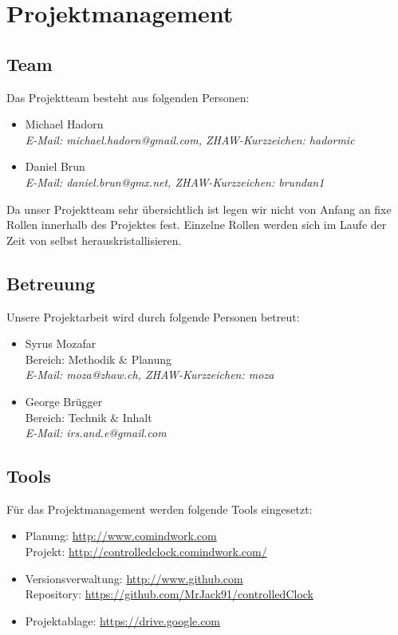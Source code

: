 
\chapter{Projektmanagement}



\section{Team}
Das Projektteam besteht aus folgenden Personen:
\begin{itemize}
\item Michael Hadorn\\
\textit{E-Mail: michael.hadorn@gmail.com, ZHAW-Kurzzeichen: hadormic} 
\item Daniel Brun \\
\textit{E-Mail: daniel.brun@gmx.net, ZHAW-Kurzzeichen: brundan1} 
\end{itemize}

Da unser Projektteam sehr übersichtlich ist legen wir nicht von Anfang an fixe Rollen innerhalb des Projektes fest. Einzelne Rollen werden sich im Laufe der Zeit von selbst herauskristallisieren. 

\section{Betreuung}
Unsere Projektarbeit wird durch folgende Personen betreut:
\begin{itemize}
\item Syrus Mozafar\\
Bereich: Methodik \& Planung \\
\textit{E-Mail: moza@zhaw.ch, ZHAW-Kurzzeichen: moza} 
\item George Brügger \\
Bereich: Technik \& Inhalt \\
\textit{E-Mail: irs.and.e@gmail.com} 
\end{itemize}

\section{Tools}
Für das Projektmanagement werden folgende Tools eingesetzt:
\begin{itemize}
\item Planung: \url{http://www.comindwork.com}\\
Projekt: \url{http://controlledclock.comindwork.com/}
\item Versionsverwaltung: \url{http://www.github.com}\\
Repository: \url{https://github.com/MrJack91/controlledClock}
\item Projektablage: \url{https://drive.google.com}
\end{itemize}


